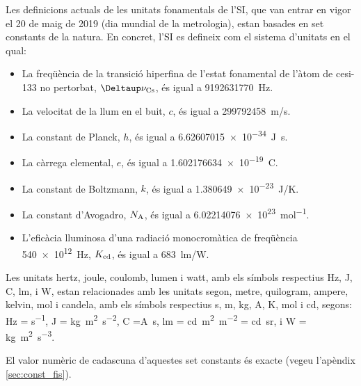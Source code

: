 Les definicions actuals de les unitats fonamentals de l'SI, que van entrar en vigor el 20 de maig de 2019 (dia mundial de la metrologia), estan basades en set constants de la natura. En concret, l'SI es defineix com el  sistema d'unitats en el qual:
\begin{itemize}

\item La freqüència de la transició hiperfina de l'estat fonamental de l'àtom de cesi-133 no pertorbat, $\Deltaup\nu\ped{Cs}$, és igual a \qty{9 192 631 770}{Hz}.
\item La velocitat de la llum en el buit, $c$, és igual a \qty{299792458}{m/s}.
\item La constant de Planck, $h$, és igual a \qty{6,62607015 e-34}{J.s}.
\item La càrrega elemental, $e$, és igual a \qty{1,602176634 e-19}{C}.
\item La constant de Boltzmann, $k$, és igual a \qty{1,380649e-23}{J/K}.
\item La constant d'Avogadro, $N_\mathrm{A}$, és igual a \qty{6,02214076 e23}{mol^{-1}}.
\item L'eficàcia lluminosa d'una radiació monocromàtica de freqüència \qty{540e12}{Hz},  $K_\mathrm{cd}$, és igual a \qty{683}{lm/W}.
\end{itemize}


Les unitats  hertz, joule, coulomb, lumen i watt, amb els símbols respectius Hz, J, C, lm, i W, estan relacionades amb les unitats segon, metre, quilogram, ampere, kelvin, mol i candela, amb els símbols respectius s, m, kg, A, K, mol i cd, segons:  Hz = \unit{s^{-1}}, J = \unit{kg.m^2.s^{-2}}, C =\unit{A.s}, lm = \unit{cd.m^2.m^{-2}} = \unit{cd.sr}, i W = \unit{kg.m^2.s^{-3}}.

El valor numèric de cadascuna d'aquestes set constants és exacte (vegeu l'apèndix \vref{sec:const_fis}).

